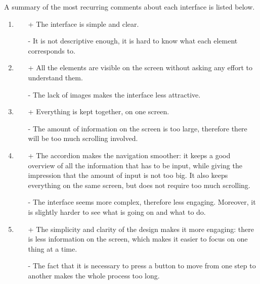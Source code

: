 \documentclass{mproj}
\begin{document}
A summary of the most recurring comments about each interface is listed below.

\begin{enumerate}[label=\Alph*,topsep=0pt]
	\item 
	\begin{itemize} 
		\item[+] The interface is simple and clear. 
		\item[-] It is not descriptive enough, it is hard to know what each element corresponds to.
	\end{itemize}
	
	\item 
	\begin{itemize}
		\item[+] All the elements are visible on the screen without asking any effort to understand them.
		\item[-] The lack of images makes the interface less attractive.
	\end{itemize} 
	
	\item
	\begin{itemize}
		\item[+] Everything is kept together, on one screen.
		\item[-] The amount of information on the screen is too large, therefore there will be too much scrolling involved.
	\end{itemize} 
	
	\item
	\begin{itemize}
		\item[+] The accordion makes the navigation smoother: it keeps a good overview of all the information that has to be input, while giving the impression that the amount of input is not too big. It also keeps everything on the same screen, but does not require too much scrolling.
		\item[-] The interface seems more complex, therefore less engaging. Moreover, it is slightly harder to see what is going on and what to do.
	\end{itemize} 
	
	\item
	\begin{itemize}
		\item[+] The simplicity and clarity of the design makes it more engaging: there is less information on the screen, which makes it easier to focus on one thing at a time.
		\item[-] The fact that it is necessary to press a button to move from one step to another makes the whole process too long.
	\end{itemize} 
\end{enumerate}
\end{document}
